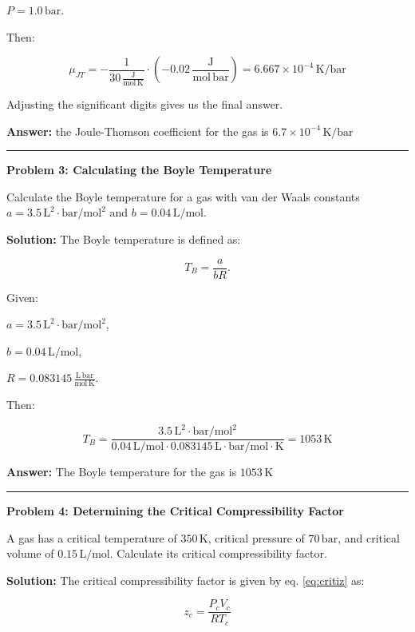 \documentclass[
  9pt,
]{extbook}
\theoremstyle{definition}
\theoremstyle{definition}
\theoremstyle{definition}
\theoremstyle{definition}
\theoremstyle{remark}
\begin{document}
\(P = 1.0\,\text{bar}\).

Then:

\[\mu_{JT} = -\frac{1}{30\,\frac{\text{J}}{\text{mol}\,\text{K}}} \cdot \left(-0.02\,\frac{\text{J}}{\text{mol}\,\text{bar}}\right) = 6.667 \times 10^{-4}\,\text{K}/\text{bar}\]

Adjusting the significant digits gives us the final answer.

\textbf{Answer:} the Joule-Thomson coefficient for the gas is \(6.7 \times 10^{-4}\,\text{K}/\text{bar}\)

\begin{center}\rule{0.5\linewidth}{0.5pt}\end{center}

\textbf{Problem 3: Calculating the Boyle Temperature}

Calculate the Boyle temperature for a gas with van der Waals constants \(a = 3.5\,\text{L}^2\cdot\text{bar}/\text{mol}^2\) and \(b = 0.04\,\text{L}/\text{mol}\).

\textbf{Solution:} The Boyle temperature is defined as:

\[T_B = \frac{a}{bR}.\]

Given:

\(a = 3.5\,\text{L}^2\cdot\text{bar}/\text{mol}^2\),

\(b = 0.04\,\text{L}/\text{mol}\),

\(R = 0.083145\,\frac{\text{L}\,\text{bar}}{\text{mol}\,\text{K}}\).

Then:

\[T_B = \frac{3.5\,\text{L}^2\cdot\text{bar}/\text{mol}^2}{0.04\,\text{L}/\text{mol} \cdot 0.083145\,\text{L}\cdot\text{bar}/\text{mol}\cdot\text{K}}=1053\,\text{K}\]

\textbf{Answer:} The Boyle temperature for the gas is
\(1053\,\text{K}\)

\begin{center}\rule{0.5\linewidth}{0.5pt}\end{center}

\textbf{Problem 4: Determining the Critical Compressibility Factor}

A gas has a critical temperature of \(350\,\text{K}\), critical pressure of \(70\,\text{bar}\), and critical volume of \(0.15\,\text{L}/\text{mol}\). Calculate its critical compressibility factor.

\textbf{Solution:} The critical compressibility factor is given by eq. \eqref{eq:critiz} as:

\[z_c = \frac{P_cV_c}{RT_c}\]
\end{document}
